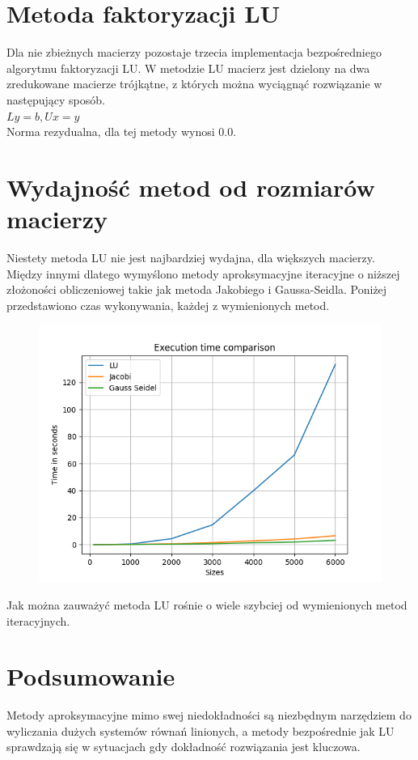 \documentclass{article}
\begin{document}
\newpage
\section{Metoda faktoryzacji LU}
Dla nie zbieżnych macierzy pozostaje trzecia implementacja bezpośredniego algorytmu
faktoryzacji LU. W metodzie LU macierz jest dzielony na dwa zredukowane macierze trójkątne,
z których można wyciągnąć rozwiązanie w następujący sposób. \\
\( Ly = b, Ux = y\) \\
Norma rezydualna, dla tej metody wynosi 0.0.

\section{Wydajność metod od rozmiarów macierzy}
Niestety metoda LU nie jest najbardziej wydajna, dla większych macierzy. Między innymi dlatego wymyślono metody aproksymacyjne iteracyjne o niższej złożoności obliczeniowej takie jak metoda Jakobiego i  Gaussa-Seidla.
Poniżej przedstawiono czas wykonywania, każdej z wymienionych metod.
\begin{figure}[H]
    \centering
    \includegraphics[width=1\linewidth]{figure2.png}
\end{figure}

Jak można zauważyć metoda LU rośnie o wiele szybciej od wymienionych metod iteracyjnych.

\section{Podsumowanie}
Metody aproksymacyjne mimo swej niedokładności są niezbędnym narzędziem do wyliczania dużych systemów równań linionych, a metody bezpośrednie jak LU sprawdzają się w sytuacjach gdy dokładność rozwiązania jest kluczowa.
\end{document}
